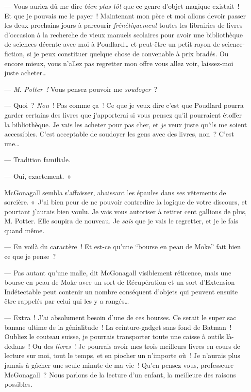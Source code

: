--- Vous auriez dû me dire \emph{bien plus tôt} que ce genre d'objet magique existait~! Et que je pouvais me le payer~! Maintenant mon père et moi allons devoir passer les deux prochains jours à parcourir \emph{frénétiquement} toutes les librairies de livres d'occasion à la recherche de vieux manuels scolaires pour avoir une bibliothèque de sciences décente avec moi à Poudlard… et peut-être un petit rayon de science-fiction, si je peux constituer quelque chose de convenable à prix bradés. Ou encore mieux, vous n'allez pas regretter mon offre vous allez voir, laissez-moi juste acheter…

--- \emph{M. Potter~!} Vous pensez pouvoir me \emph{soudoyer}~?

--- Quoi~? \emph{Non}~! Pas comme ça~! Ce que je veux dire c'est que Poudlard pourra garder certains des livres que j'apporterai si vous pensez qu'il pourraient étoffer la bibliothèque. Je vais les acheter pour pas cher, et \emph{je} veux juste qu'ils me soient accessibles.  C'est acceptable de soudoyer les gens avec des livres, non~? C'est une…

--- Tradition familiale.

--- Oui, exactement.~»

McGonagall sembla s'affaisser, abaissant les épaules dans ses vêtements de sorcière. «~J'ai bien peur de ne pouvoir contredire la logique de votre discours, et pourtant j'aurais bien voulu. Je vais vous autoriser à retirer cent gallions de plus, M. Potter. Elle soupira de nouveau. Je \emph{sais} que je vais le regretter, et je le fais quand même.

--- En voilà du caractère~! Et est-ce qu'une “bourse en peau de Moke” fait bien ce que je pense~?

--- Pas autant qu'une malle, dit McGonagall visiblement réticence, mais une bourse en peau de Moke avec un sort de Récupération et un sort d'Extension Indétectable peut contenir un nombre conséquent d'objets qui peuvent ensuite être rappelés par celui qui les y a rangés…

--- Extra~! J'ai absolument besoin d'une de ces bourses. Ce serait le super sac banane ultime de la génialitude~!  La ceinture-gadget sans fond de Batman~! Oubliez le couteau suisse, je pourrais transporter toute une caisse à outils là-dedans~! Ou des \emph{livres}~! Je pourrais avoir mes trois meilleurs livres en cours de lecture sur moi, tout le temps, et en piocher un n'importe où~! Je n'aurais plus jamais à gâcher une seule minute de ma vie~! Qu'en pensez-vous, professeure McGonagall~? Nous parlons de la lecture d'un enfant, la meilleure des raisons possibles.

